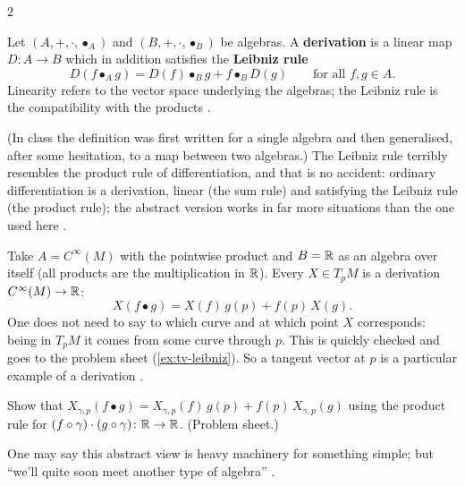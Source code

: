\begin{paracol}{2}
\begin{definition}\label{def:tv-derivation}
Let $(A,+,\cdot,\bullet_A)$ and $(B,+,\cdot,\bullet_B)$ be algebras. A \textbf{derivation} is a linear map $D\colon A\to B$ which in addition satisfies the \textbf{Leibniz rule}
\[
  D(f\bullet_A g)=D(f)\bullet_B g+f\bullet_B D(g)\qquad\text{for all }f,g\in A.
\]
Linearity refers to the vector space underlying the algebras; the Leibniz rule is the compatibility with the products      .
\end{definition}
(In class the definition was first written for a single algebra and then generalised, after some hesitation, to a map between two algebras.) The Leibniz rule terribly resembles the product rule of differentiation, and that is no accident: ordinary differentiation is a derivation, linear (the sum rule) and satisfying the Leibniz rule (the
product rule); the abstract version works in far more situations than the one used here   .

\begin{example}\label{ex:tv-der-tangent}
Take $A=C^\infty(M)$ with the pointwise product and $B=\mathbb{R}$ as an algebra over itself (all products are the multiplication in $\mathbb{R}$). Every $X\in T_pM$ is a derivation $C^\infty(M)\to\mathbb{R}$:
\[
  X(f\bullet g)=X(f)\,g(p)+f(p)\,X(g).
\]
One does not need to say to which curve and at which point $X$ corresponds: being in $T_pM$ it comes from some curve through $p$. This is quickly checked and goes to the problem sheet (\cref{ex:tv-leibniz}). So a tangent vector at $p$ is a particular example of a derivation
     .
\end{example}
\begin{exercise}\label{ex:tv-leibniz}
Show that $X_{\gamma,p}(f\bullet g)=X_{\gamma,p}(f)\,g(p)+f(p)\,X_{\gamma,p}(g)$ using the product rule for $(f\circ\gamma)\cdot(g\circ\gamma)\colon\mathbb{R}\to\mathbb{R}$. (Problem sheet.)
\end{exercise}
One may say this abstract view is heavy machinery for something simple; but ``we'll quite soon meet another type of algebra''  .


\end{paracol}
